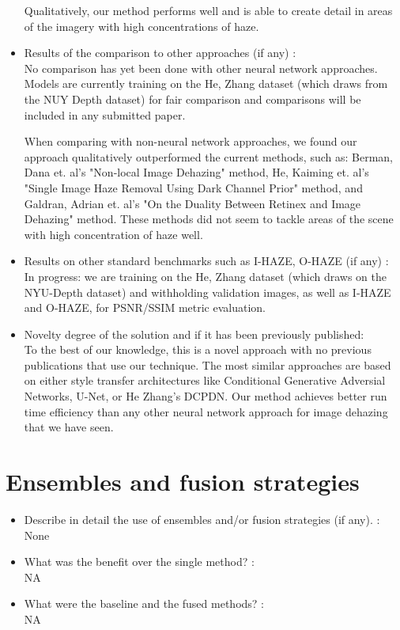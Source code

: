 \documentclass[12pt]{article}
\begin{document}
\begin{itemize}
Qualitatively, our method performs well and is able to create detail in areas of the imagery with high concentrations of haze.

\item Results of the comparison to other approaches (if any) : \\
No comparison has yet been done with other neural network approaches. Models are currently training on the He, Zhang dataset (which draws from the NUY Depth dataset) for fair comparison and comparisons will be included in any submitted paper.

When comparing with non-neural network approaches, we found our approach qualitatively outperformed the current methods, such as: Berman, Dana et. al's "Non-local Image Dehazing" method, He, Kaiming et. al's "Single Image Haze Removal Using Dark Channel Prior" method, and Galdran, Adrian et. al's "On the Duality Between Retinex and Image Dehazing" method. These methods did not seem to tackle areas of the scene with high concentration of haze well.

\item Results on other standard benchmarks such as I-HAZE, O-HAZE (if any) : \\
In progress: we are training on the He, Zhang dataset (which draws on the NYU-Depth dataset) and withholding validation images, as well as I-HAZE and O-HAZE, for PSNR/SSIM metric evaluation.
\item Novelty degree of the solution and if it has been previously published: \\
To the best of our knowledge, this is a novel approach with no previous publications that use our technique. The most similar approaches are based on either style transfer architectures like Conditional Generative Adversial Networks, U-Net, or He Zhang's DCPDN. Our method achieves better run time efficiency than any other neural network approach for image dehazing that we have seen.
\end{itemize}


\section{Ensembles and fusion strategies}
\begin{itemize}
\item Describe in detail the use of ensembles and/or fusion strategies (if any). :\\ None
\item What was the benefit over the single method? : \\NA
\item What were the baseline and the fused methods? :\\ NA
\end{itemize}
\end{document}

